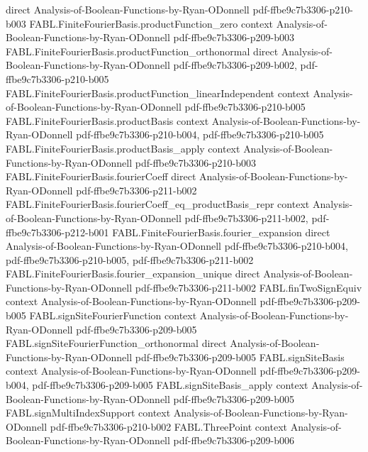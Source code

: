 \begin{theorem}
  {direct}
  {Analysis-of-Boolean-Functions-by-Ryan-ODonnell}
  {pdf-ffbe9c7b3306-p210-b003}
\proofstep
  {FABL.FiniteFourierBasis.productFunction_zero}
  {context}
  {Analysis-of-Boolean-Functions-by-Ryan-ODonnell}
  {pdf-ffbe9c7b3306-p209-b003}
\proofstep
  {FABL.FiniteFourierBasis.productFunction_orthonormal}
  {direct}
  {Analysis-of-Boolean-Functions-by-Ryan-ODonnell}
  {pdf-ffbe9c7b3306-p209-b002,
    pdf-ffbe9c7b3306-p210-b005}
\proofstep
  {FABL.FiniteFourierBasis.productFunction_linearIndependent}
  {context}
  {Analysis-of-Boolean-Functions-by-Ryan-ODonnell}
  {pdf-ffbe9c7b3306-p210-b005}
\proofstep
  {FABL.FiniteFourierBasis.productBasis}
  {context}
  {Analysis-of-Boolean-Functions-by-Ryan-ODonnell}
  {pdf-ffbe9c7b3306-p210-b004,
    pdf-ffbe9c7b3306-p210-b005}
\proofstep
  {FABL.FiniteFourierBasis.productBasis_apply}
  {context}
  {Analysis-of-Boolean-Functions-by-Ryan-ODonnell}
  {pdf-ffbe9c7b3306-p210-b003}
\proofstep
  {FABL.FiniteFourierBasis.fourierCoeff}
  {direct}
  {Analysis-of-Boolean-Functions-by-Ryan-ODonnell}
  {pdf-ffbe9c7b3306-p211-b002}
\proofstep
  {FABL.FiniteFourierBasis.fourierCoeff_eq_productBasis_repr}
  {context}
  {Analysis-of-Boolean-Functions-by-Ryan-ODonnell}
  {pdf-ffbe9c7b3306-p211-b002,
    pdf-ffbe9c7b3306-p212-b001}
\proofstep
  {FABL.FiniteFourierBasis.fourier_expansion}
  {direct}
  {Analysis-of-Boolean-Functions-by-Ryan-ODonnell}
  {pdf-ffbe9c7b3306-p210-b004,
    pdf-ffbe9c7b3306-p210-b005,
    pdf-ffbe9c7b3306-p211-b002}
\proofstep
  {FABL.FiniteFourierBasis.fourier_expansion_unique}
  {direct}
  {Analysis-of-Boolean-Functions-by-Ryan-ODonnell}
  {pdf-ffbe9c7b3306-p211-b002}
\proofstep
  {FABL.finTwoSignEquiv}
  {context}
  {Analysis-of-Boolean-Functions-by-Ryan-ODonnell}
  {pdf-ffbe9c7b3306-p209-b005}
\proofstep
  {FABL.signSiteFourierFunction}
  {context}
  {Analysis-of-Boolean-Functions-by-Ryan-ODonnell}
  {pdf-ffbe9c7b3306-p209-b005}
\proofstep
  {FABL.signSiteFourierFunction_orthonormal}
  {direct}
  {Analysis-of-Boolean-Functions-by-Ryan-ODonnell}
  {pdf-ffbe9c7b3306-p209-b005}
\proofstep
  {FABL.signSiteBasis}
  {context}
  {Analysis-of-Boolean-Functions-by-Ryan-ODonnell}
  {pdf-ffbe9c7b3306-p209-b004,
    pdf-ffbe9c7b3306-p209-b005}
\proofstep
  {FABL.signSiteBasis_apply}
  {context}
  {Analysis-of-Boolean-Functions-by-Ryan-ODonnell}
  {pdf-ffbe9c7b3306-p209-b005}
\proofstep
  {FABL.signMultiIndexSupport}
  {context}
  {Analysis-of-Boolean-Functions-by-Ryan-ODonnell}
  {pdf-ffbe9c7b3306-p210-b002}
\proofstep
  {FABL.ThreePoint}
  {context}
  {Analysis-of-Boolean-Functions-by-Ryan-ODonnell}
  {pdf-ffbe9c7b3306-p209-b006}

\end{theorem}
